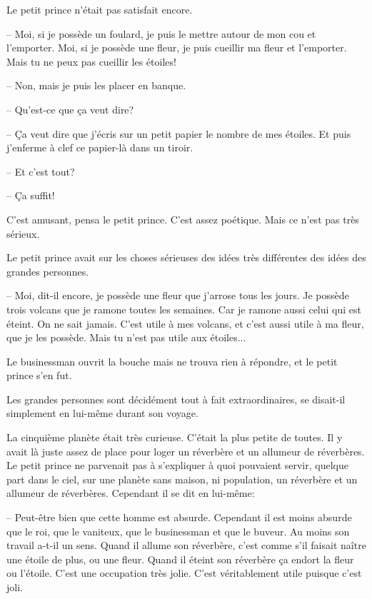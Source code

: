 \documentclass[a4paper]{report}
\begin{document}
Le petit prince n'était pas satisfait encore.

-- Moi, si je possède un foulard, je puis le mettre autour de mon cou et l'emporter. Moi, si je possède une fleur, je puis cueillir ma fleur et l'emporter. Mais tu ne peux pas cueillir les étoiles!

-- Non, mais je puis les placer en banque.

-- Qu'est-ce que ça veut dire?

-- Ça veut dire que j'écris sur un petit papier le nombre de mes étoiles. Et puis j'enferme à clef ce papier-là dans un tiroir.

-- Et c'est tout?

-- Ça suffit!

C'est amusant, pensa le petit prince. C'est assez poétique. Mais ce n'est pas très sérieux.

Le petit prince avait sur les choses sérieuses des idées très différentes des idées des grandes personnes.

-- Moi, dit-il encore, je possède une fleur que j'arrose tous les jours. Je possède trois volcans que je ramone toutes les semaines. Car je ramone aussi celui qui est éteint. On ne sait jamais. C'est utile à mes volcans, et c'est aussi utile à ma fleur, que je les possède. Mais tu n'est pas utile aux étoiles...

Le businessman ouvrit la bouche mais ne trouva rien à répondre, et le petit prince s'en fut.

Les grandes personnes sont décidément tout à fait extraordinaires, se disait-il simplement en lui-même durant son voyage.

\parachapter{} %
La cinquième planète était très curieuse. C'était la plus petite de toutes. Il y avait là juste assez de place pour loger un réverbère et un allumeur de réverbères. Le petit prince ne parvenait pas à s'expliquer à quoi pouvaient servir, quelque part dans le ciel, sur une planète sans maison, ni population, un réverbère et un allumeur de réverbères. Cependant il se dit en lui-même:

--  Peut-être bien que cette homme est absurde. Cependant il est moins absurde que le roi, que le vaniteux, que le businessman et que le buveur. Au moins son travail a-t-il un sens. Quand il allume son réverbère, c'est comme s'il faisait naître une étoile de plus, ou une fleur. Quand il éteint son réverbère ça endort la fleur ou l'étoile. C'est une occupation très jolie. C'est véritablement utile puisque c'est joli.
\end{document}
